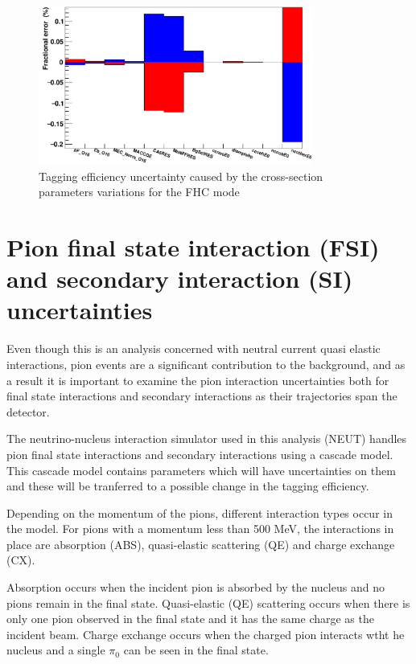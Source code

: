 \begin{figure}[!htb]
\centering
\includegraphics[width=0.8\textwidth]{Figures/xsec_uncertainty.png}
\caption{Tagging efficiency uncertainty caused by the cross-section parameters variations for the FHC mode}
\label{fig:xsecuncertainty}
\end{figure}

\section{Pion final state interaction (FSI) and secondary interaction (SI) uncertainties}

Even though this is an analysis concerned with neutral current quasi elastic interactions, pion events are a significant contribution to the background, and as a result it is important to examine the pion interaction uncertainties both for final state interactions and secondary interactions as their trajectories span the detector. 
\newline


The neutrino-nucleus interaction simulator used in this analysis (NEUT) handles pion final state interactions and secondary interactions using a cascade model. This cascade model contains parameters which will have uncertainties on them and these will be tranferred to a possible change in the tagging efficiency.

Depending on the momentum of the pions, different interaction types occur in the model. For pions with a momentum less than 500 MeV, the interactions in place are absorption (ABS), quasi-elastic scattering (QE) and charge exchange (CX).

Absorption occurs when the incident pion is absorbed by the nucleus and no pions remain in the final state. Quasi-elastic (QE) scattering occurs when there is only one pion observed in the final state and it has the same charge as the incident beam. Charge exchange occurs when the charged pion interacts wtht he nucleus and a single $\pi_{0}$ can be seen in the final state.


